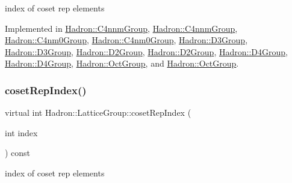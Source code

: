 index of coset rep elements 

Implemented in \mbox{\hyperlink{structHadron_1_1C4nnmGroup_a413031d9855013b22c493696c69a2c4d}{Hadron\+::\+C4nnm\+Group}}, \mbox{\hyperlink{structHadron_1_1C4nnmGroup_a413031d9855013b22c493696c69a2c4d}{Hadron\+::\+C4nnm\+Group}}, \mbox{\hyperlink{structHadron_1_1C4nm0Group_abac118ef8b96cecf62143c917e23736e}{Hadron\+::\+C4nm0\+Group}}, \mbox{\hyperlink{structHadron_1_1C4nm0Group_abac118ef8b96cecf62143c917e23736e}{Hadron\+::\+C4nm0\+Group}}, \mbox{\hyperlink{structHadron_1_1D3Group_a361cfe22330be972fe6d49bc2e1af871}{Hadron\+::\+D3\+Group}}, \mbox{\hyperlink{structHadron_1_1D3Group_a361cfe22330be972fe6d49bc2e1af871}{Hadron\+::\+D3\+Group}}, \mbox{\hyperlink{structHadron_1_1D2Group_a41bfcefe5a659b99db790f822123593f}{Hadron\+::\+D2\+Group}}, \mbox{\hyperlink{structHadron_1_1D2Group_a41bfcefe5a659b99db790f822123593f}{Hadron\+::\+D2\+Group}}, \mbox{\hyperlink{structHadron_1_1D4Group_ae7ebfa25f82987479c33f0d5d769ab2f}{Hadron\+::\+D4\+Group}}, \mbox{\hyperlink{structHadron_1_1D4Group_ae7ebfa25f82987479c33f0d5d769ab2f}{Hadron\+::\+D4\+Group}}, \mbox{\hyperlink{structHadron_1_1OctGroup_aeaabc93ad3df1b585bc1009b0bf4f5ba}{Hadron\+::\+Oct\+Group}}, and \mbox{\hyperlink{structHadron_1_1OctGroup_aeaabc93ad3df1b585bc1009b0bf4f5ba}{Hadron\+::\+Oct\+Group}}.

\mbox{\label{structHadron_1_1LatticeGroup_a7e3b9b5e2f596e6c40d64aa939a3ad6c}} 
\subsubsection{\texorpdfstring{cosetRepIndex()}{cosetRepIndex()}\hspace{0.1cm}{\footnotesize\ttfamily [2/2]}}
{\footnotesize\ttfamily virtual int Hadron\+::\+Lattice\+Group\+::coset\+Rep\+Index (\begin{DoxyParamCaption}\item[{int}]{index }\end{DoxyParamCaption}) const\hspace{0.3cm}{\ttfamily [pure virtual]}}

index of coset rep elements 

